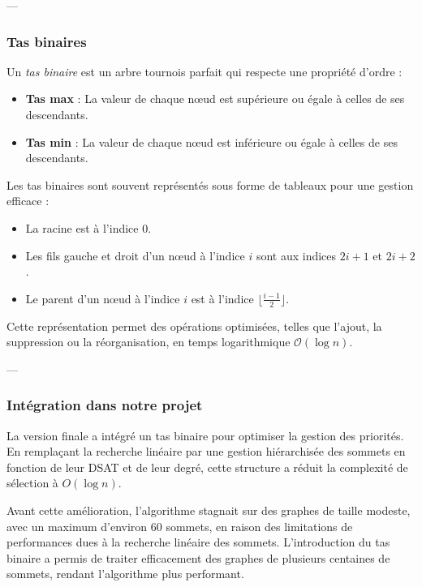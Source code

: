 \documentclass[11pt]{article}
\begin{document}
---

\subsubsection{Tas binaires}
Un \textit{tas binaire} est un arbre tournois parfait qui respecte une propriété d’ordre : \cite {data_structure_complements}
\begin{itemize}
    \item \textbf{Tas max} : La valeur de chaque nœud est supérieure ou égale à celles de ses descendants.
    \item \textbf{Tas min} : La valeur de chaque nœud est inférieure ou égale à celles de ses descendants.
\end{itemize}

Les tas binaires sont souvent représentés sous forme de tableaux pour une gestion efficace :
\begin{itemize}
    \item La racine est à l'indice $0$.
    \item Les fils gauche et droit d’un nœud à l’indice $i$ sont aux indices $2i+1$ et $2i+2$.
    \item Le parent d’un nœud à l’indice $i$ est à l’indice $\lfloor \frac{i-1}{2} \rfloor$.
\end{itemize}

Cette représentation permet des opérations optimisées, telles que l'ajout, la suppression ou la réorganisation, en temps logarithmique $\mathcal{O}(\log n)$.

---

\subsubsection{Intégration dans notre projet}


La version finale a intégré un tas binaire pour optimiser la gestion des priorités. En remplaçant la recherche linéaire par une gestion hiérarchisée des sommets en fonction de leur DSAT et de leur degré, cette structure a réduit la complexité de sélection à \( O(\log n) \).

Avant cette amélioration, l’algorithme stagnait sur des graphes de taille modeste, avec un maximum d’environ 60 sommets, en raison des limitations de performances dues à la recherche linéaire des sommets. L’introduction du tas binaire a permis de traiter efficacement des graphes de plusieurs centaines de sommets, rendant l’algorithme plus performant.
\end{document}
